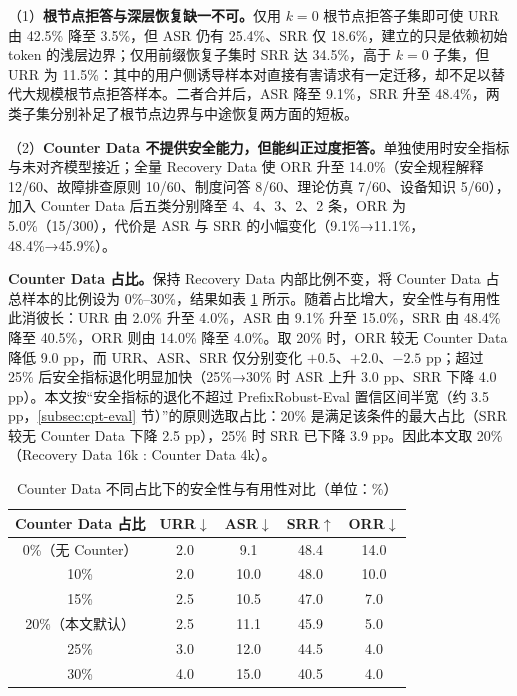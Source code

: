 \documentclass[fontset=fandol,type=master,campus=shenzhen,etitleauto=true]{hithesisbook}
\begin{document}
（1）\textbf{根节点拒答与深层恢复缺一不可。}仅用 $k = 0$ 根节点拒答子集即可使 URR 由 42.5\% 降至 3.5\%，但 ASR 仍有 25.4\%、SRR 仅 18.6\%，建立的只是依赖初始 token 的浅层边界；仅用前缀恢复子集时 SRR 达 34.5\%，高于 $k = 0$ 子集，但 URR 为 11.5\%：其中的用户侧诱导样本对直接有害请求有一定迁移，却不足以替代大规模根节点拒答样本。二者合并后，ASR 降至 9.1\%，SRR 升至 48.4\%，两类子集分别补足了根节点边界与中途恢复两方面的短板。

（2）\textbf{Counter Data 不提供安全能力，但能纠正过度拒答。}单独使用时安全指标与未对齐模型接近；全量 Recovery Data 使 ORR 升至 14.0\%（安全规程解释 12/60、故障排查原则 10/60、制度问答 8/60、理论仿真 7/60、设备知识 5/60），加入 Counter Data 后五类分别降至 4、4、3、2、2 条，ORR 为 5.0\%（15/300），代价是 ASR 与 SRR 的小幅变化（9.1\%→11.1\%，48.4\%→45.9\%）。

\textbf{Counter Data 占比。}\label{counter-data-ux6bd4ux4f8bux7684ux5f71ux54cdux5206ux6790}保持 Recovery Data 内部比例不变，将 Counter Data 占总样本的比例设为 0\%--30\%，结果如表 \ref{tab:counter-ratio} 所示。随着占比增大，安全性与有用性此消彼长：URR 由 2.0\% 升至 4.0\%，ASR 由 9.1\% 升至 15.0\%，SRR 由 48.4\% 降至 40.5\%，ORR 则由 14.0\% 降至 4.0\%。取 20\% 时，ORR 较无 Counter Data 降低 9.0 pp，而 URR、ASR、SRR 仅分别变化 $+0.5$、$+2.0$、$-2.5$ pp；超过 25\% 后安全指标退化明显加快（25\%→30\% 时 ASR 上升 3.0 pp、SRR 下降 4.0 pp）。本文按“安全指标的退化不超过 PrefixRobust-Eval 置信区间半宽（约 3.5 pp，\ref{subsec:cpt-eval} 节）”的原则选取占比：20\% 是满足该条件的最大占比（SRR 较无 Counter Data 下降 2.5 pp），25\% 时 SRR 已下降 3.9 pp。因此本文取 20\%（Recovery Data 16k : Counter Data 4k）。

\begin{table}[htbp]
\centering
\caption{Counter Data 不同占比下的安全性与有用性对比（单位：\%）}
\label{tab:counter-ratio}
\small
\renewcommand{\arraystretch}{1.1}
\begin{tabular}{c c c c c}
\toprule
\textbf{Counter Data 占比} & \textbf{URR$\downarrow$} & \textbf{ASR$\downarrow$} & \textbf{SRR$\uparrow$} & \textbf{ORR$\downarrow$} \\
\midrule
0\%（无 Counter） & 2.0 & 9.1 & 48.4 & 14.0 \\
10\% & 2.0 & 10.0 & 48.0 & 10.0 \\
15\% & 2.5 & 10.5 & 47.0 & 7.0 \\
20\%（本文默认） & 2.5 & 11.1 & 45.9 & 5.0 \\
25\% & 3.0 & 12.0 & 44.5 & 4.0 \\
30\% & 4.0 & 15.0 & 40.5 & 4.0 \\
\bottomrule
\end{tabular}
\end{table}
\end{document}
